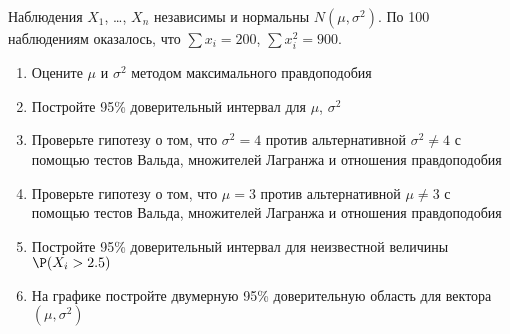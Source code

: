 \documentclass[pdftex,11pt,openany]{book}\usepackage[]{graphicx}\usepackage[]{color}
\begin{document}
\begin{problem}
Наблюдения $X_1$, \ldots, $X_n$ независимы и нормальны $N(\mu,\sigma^2)$. По 100 наблюдениям оказалось, что $\sum x_i=200$, $\sum x_i^2=900$.
\begin{enumerate}
\item Оцените $\mu$ и $\sigma^2$ методом максимального правдоподобия
\item Постройте 95\% доверительный интервал для $\mu$, $\sigma^2$
\item \useR Проверьте гипотезу о том, что $\sigma^2=4$ против альтернативной $\sigma^2\neq 4$ с помощью тестов Вальда, множителей Лагранжа и отношения правдоподобия
\item \useR Проверьте гипотезу о том, что $\mu=3$ против альтернативной $\mu\neq 3$ с помощью тестов Вальда, множителей Лагранжа и отношения правдоподобия
\item \useR Постройте 95\% доверительный интервал для неизвестной величины $\P(X_i>2.5)$
\item \useR На графике постройте двумерную 95\% доверительную область для вектора $(\mu,\sigma^2)$
\end{enumerate}
\end{problem}
\end{document}
